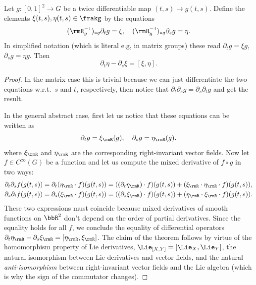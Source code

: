 \begin{prop}\label{prop MC eq xi eta}
    Let $g:[0,1]^2\to G$ be a twice differentiable map $(t,s)\mapsto g(t,s)$. Define the elements $\xi(t,s),\eta(t,s)\in\frakg$ by the equations
    \[(\rmR_{g}^{-1})_{\ast g}\partial_t g=\xi, \quad (\rmR_{g}^{-1})_{\ast g}\partial_s g=\eta.\]
    In simplified notation (which is literal e.g, in matrix groups) these read $\partial_t g=\xi g$, $\partial_s g=\eta g$. Then 
    \[\partial_t \eta-\partial_s \xi =[\xi,\eta].\label{eq Maurer-Cartan}\]
\end{prop}
\begin{proof}
    In the matrix case this is trivial because we can just differentiate the two equations w.r.t.\ $s$ and $t$, respectively, then notice that $\partial_t\partial_s g=\partial_s\partial_t g$ and get the result.

    In the general abstract case, first let us notice that these equations can be written as
    \[\partial_t g=\xi_\rmR(g),\quad \partial_s g=\eta_\rmR(g).\]
    where $\xi_\rmR$ and $\eta_\rmR$ are the corresponding right-invariant vector fields. Now let $f\in C^\infty(G)$ be a function and let us compute the mixed derivative of $f\circ g$ in two ways:
    \begin{gather}
        \partial_t\partial_s f(g(t,s))=\partial_t (\eta_\rmR\cdot f)(g(t,s))=((\partial_t\eta_\rmR)\cdot f)(g(t,s))+(\xi_\rmR\cdot \eta_\rmR\cdot f)(g(t,s)),\\
        \partial_s\partial_t f(g(t,s))=\partial_s (\xi_\rmR\cdot f)(g(t,s))=((\partial_s\xi_\rmR)\cdot f)(g(t,s))+(\eta_\rmR\cdot \xi_\rmR\cdot f)(g(t,s)).
    \end{gather}
    These two expressions must coincide because mixed derivatives of smooth functions on $\bbR^2$ don't depend on the order of partial derivatives. Since the equality holds for all $f$, we conclude the equality of differential operators $\partial_t\eta_\rmR-\partial_s\xi_\rmR=[\eta_\rmR,\xi_\rmR]$. The claim of the theorem follows by virtue of the homomorphism property of Lie derivatives, $\Lie_{[X,Y]}=[\Lie_X,\Lie_Y]$, the natural isomorphism between Lie derivatives and vector fields, and the natural \emph{anti-isomorphism} between right-invariant vector fields and the Lie algebra (which is why the sign of the commutator changes).
\end{proof}

